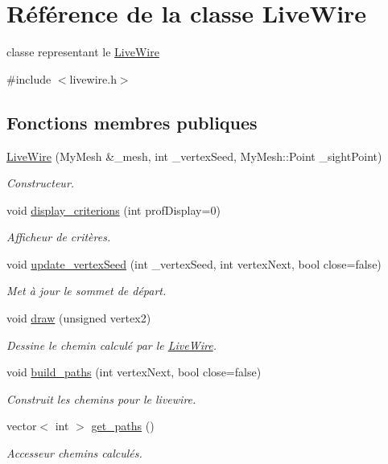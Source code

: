 \hypertarget{classLiveWire}{}\section{Référence de la classe Live\+Wire}
\label{classLiveWire}


classe representant le \hyperlink{classLiveWire}{Live\+Wire}  




{\ttfamily \#include $<$livewire.\+h$>$}

\subsection*{Fonctions membres publiques}
\begin{DoxyCompactItemize}
\item 
\hyperlink{classLiveWire_abc36982cf24dcf6ac80aeaaa2e6ee7de}{Live\+Wire} (My\+Mesh \&\+\_\+mesh, int \+\_\+vertex\+Seed, My\+Mesh\+::\+Point \+\_\+sight\+Point)
\begin{DoxyCompactList}\small\item\em Constructeur. \end{DoxyCompactList}\item 
void \hyperlink{classLiveWire_a6c6ced430d7fd80faeb4ba03c8553642}{display\+\_\+criterions} (int prof\+Display=0)
\begin{DoxyCompactList}\small\item\em Afficheur de critères. \end{DoxyCompactList}\item 
void \hyperlink{classLiveWire_af76b35975d3b17c4c831103df2a99a41}{update\+\_\+vertex\+Seed} (int \+\_\+vertex\+Seed, int vertex\+Next, bool close=false)
\begin{DoxyCompactList}\small\item\em Met à jour le sommet de départ. \end{DoxyCompactList}\item 
void \hyperlink{classLiveWire_ad5f6d3ed25f17e9ef59dcab06436fbf5}{draw} (unsigned vertex2)
\begin{DoxyCompactList}\small\item\em Dessine le chemin calculé par le \hyperlink{classLiveWire}{Live\+Wire}. \end{DoxyCompactList}\item 
void \hyperlink{classLiveWire_a41a127be9f1d85aea471310a614de0b4}{build\+\_\+paths} (int vertex\+Next, bool close=false)
\begin{DoxyCompactList}\small\item\em Construit les chemins pour le livewire. \end{DoxyCompactList}\item 
vector$<$ int $>$ \hyperlink{classLiveWire_a84b0d58817a209322cc11525423c2472}{get\+\_\+paths} ()
\begin{DoxyCompactList}\small\item\em Accesseur chemins calculés. \end{DoxyCompactList}\end{DoxyCompactItemize}


